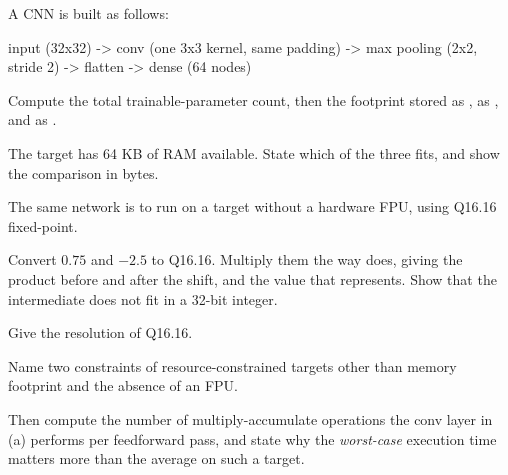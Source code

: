  A CNN is built as follows:

\begin{console}
input (32x32) -> conv (one 3x3 kernel, same padding) -> max pooling (2x2, stride 2)
              -> flatten -> dense (64 nodes)
\end{console}

\noindent Compute the total trainable-parameter count, then the footprint stored as ,
as , and as .

The target has 64 KB of RAM available. State which of the three fits, and show the comparison in
bytes. 

 The same network is to run on a target without a hardware FPU, using Q16.16 fixed-point.

Convert $0.75$ and $-2.5$ to Q16.16. Multiply them the way  does, giving the
product before and after the shift, and the value that represents. Show that the intermediate does
not fit in a 32-bit integer.

Give the resolution of Q16.16. 

 Name two constraints of resource-constrained targets other than memory footprint and the
absence of an FPU.

Then compute the number of multiply-accumulate operations the conv layer in (a) performs per
feedforward pass, and state why the \emph{worst-case} execution time matters more than the average
on such a target. 
